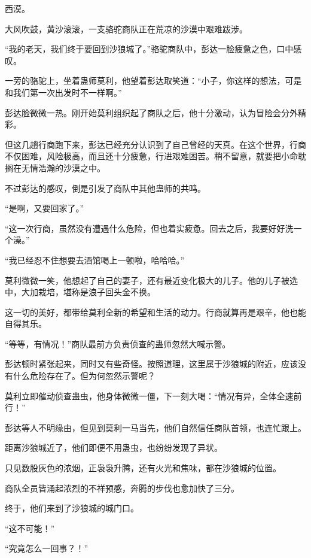 
\begin{this_body}



西漠。

大风吹鼓，黄沙滚滚，一支骆驼商队正在荒凉的沙漠中艰难跋涉。

“我的老天，我们终于要回到沙狼城了。”骆驼商队中，彭达一脸疲惫之色，口中感叹。

一旁的骆驼上，坐着蛊师莫利，他望着彭达取笑道：“小子，你这样的想法，可是和我们第一次出发时不一样啊。”

彭达脸微微一热。刚开始莫利组织起了商队之后，他十分激动，认为冒险会分外精彩。

但这几趟行商跑下来，彭达已经充分认识到了自己曾经的天真。在这个世界，行商不仅困难，风险极高，而且还十分疲惫，行进艰难困苦。稍不留意，就要把小命耽搁在无情浩瀚的沙漠之中。

不过彭达的感叹，倒是引发了商队中其他蛊师的共鸣。

“是啊，又要回家了。”

“这一次行商，虽然没有遭遇什么危险，但也着实疲惫。回去之后，我要好好洗一个澡。”

“我已经忍不住想要去酒馆喝上一顿啦，哈哈哈。”

莫利微微一笑，他想起了自己的妻子，还有最近变化极大的儿子。他的儿子被选中，大加栽培，堪称是浪子回头金不换。

这一切的美好，都带给莫利全新的希望和生活的动力。行商就算再是艰辛，他也能自得其乐。

“等等，有情况！”商队最前方负责侦查的蛊师忽然大喊示警。

彭达顿时紧张起来，同时又有些奇怪。按照道理，这里属于沙狼城的附近，应该没有什么危险存在了。但为何忽然示警呢？

莫利立即催动侦查蛊虫，他身体微微一僵，下一刻大喝：“情况有异，全体全速前行！”

彭达等人不明缘由，但见到莫利一马当先，他们自然信任商队首领，也连忙跟上。

距离沙狼城近了，他们即便不用蛊虫，也纷纷发现了异状。

只见数股灰色的浓烟，正袅袅升腾，还有火光和焦味，都在沙狼城的位置。

商队全员皆涌起浓烈的不祥预感，奔腾的步伐也愈加快了三分。

终于，他们来到了沙狼城的城门口。

“这不可能！”

“究竟怎么一回事？！”


\end{this_body}
